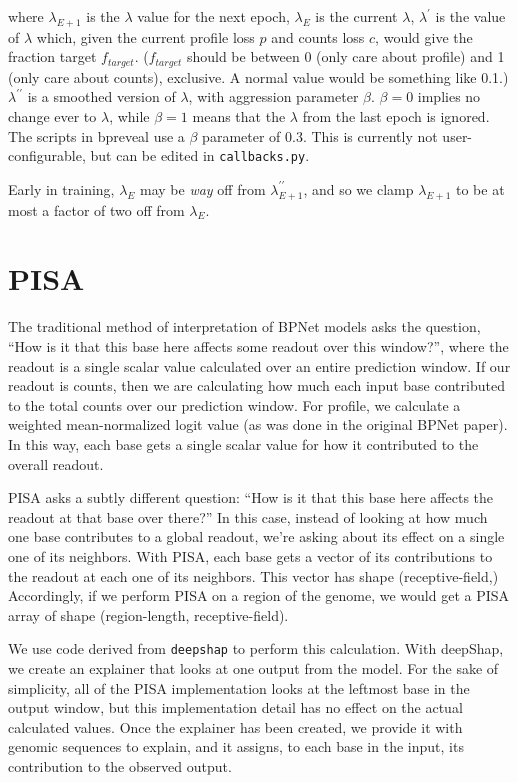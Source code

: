 \documentclass{article}
\begin{document}
where $\lambda_{E+1}$ is the $\lambda$ value for the next epoch, $\lambda_E$ is the current $\lambda$,
$\lambda^{\prime}$ is the value of $\lambda$ which, given the current
profile loss $p$ and counts loss $c$, would give the fraction target $f_{target}$.
($f_{target}$ should be between 0 (only care about profile) and 1 (only care about counts),
exclusive. A normal value would be something like 0.1.)
$\lambda^{\prime\prime}$ is a smoothed version of $\lambda$, with 
aggression parameter $\beta$. $\beta=0$ implies no change ever to $\lambda$,
while $\beta = 1$ means that the $\lambda$ from the last epoch is ignored.
The scripts in bpreveal use a $\beta$ parameter of 0.3. This is currently not user-configurable,
but can be edited in \texttt{callbacks.py}.

Early in training, $\lambda_E$ may be \emph{way} off from $\lambda^{\prime\prime}_{E+1}$, and
so we clamp $\lambda_{E+1}$ to be at most a factor of two off from $\lambda_E$.

\section{PISA}\label{sec:pisa}
The traditional method of interpretation of BPNet models asks the question,
``How is it that this base here affects some readout over this window?'',
where the readout is a single scalar value calculated over an entire prediction window.
If our readout is counts, then we are calculating how much each input base contributed to the
total counts over our prediction window. For profile, we calculate a weighted mean-normalized
logit value (as was done in the original BPNet paper). In this way, each base gets a single scalar
value for how it contributed to the overall readout.

PISA asks a subtly different question:
``How is it that this base here affects the readout at that base over there?''
In this case, instead of looking at how much one base contributes to a global readout, we're
asking about its effect on a single one of its neighbors. With PISA, each base gets a vector of
its contributions to the readout at each one of its neighbors.
This vector has shape (receptive-field,)
Accordingly, if we perform PISA on a region of the genome, we would get a PISA array of shape
(region-length, receptive-field).

We use code derived from \texttt{deepshap} to perform this calculation. With deepShap, we create
an explainer that looks at one output from the model. For the sake of simplicity, all of the PISA
implementation looks at the leftmost base in the output window, but this implementation detail
has no effect on the actual calculated values.
Once the explainer has been created, we provide it with genomic sequences to explain, and it
assigns, to each base in the input, its contribution to the observed output.
\end{document}
